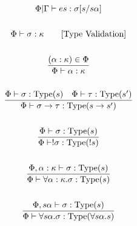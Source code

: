 \documentclass {article}
\begin{document}
\begin{gather*}
{\Phi | \Gamma \vdash e s : \sigma [s/s \alpha]} \\
\\
\Phi \vdash \sigma : \kappa \tag* {[\text{Type Validation}]} \\
\\
\frac
{(\alpha : \kappa) \in \Phi}
{\Phi \vdash \alpha : \kappa} \\
\\
\frac
{\Phi \vdash \sigma : \text{Type} (s) \quad \Phi \vdash \tau : \text{Type} (s')}
{\Phi \vdash \sigma \to \tau : \text{Type} (s \to s')} \\
\\
\frac
{\Phi \vdash \sigma : \text{Type} (s)}
{\Phi \vdash !\sigma : \text{Type} (!s)} \\
\\
\frac
{\Phi, \alpha : \kappa \vdash \sigma : \text{Type}(s) }
{\Phi \vdash \forall \alpha : \kappa. \sigma : \text{Type} (s) } \\
\\
\frac
{\Phi, s \alpha \vdash \sigma : \text{Type} (s) }
{\Phi \vdash \forall s \alpha. \sigma : \text{Type} (\forall s \alpha. s) } \\
\\
\end{gather*}
\end{document}
